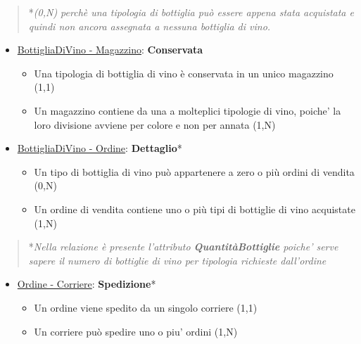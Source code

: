 \begin{verse}
	*\emph{(0,N) perchè una tipologia di bottiglia può essere appena stata acquistata e quindi non ancora assegnata a nessuna bottiglia di vino.}
\end{verse}

\begin{itemize}
	\item \underline{BottigliaDiVino - Magazzino}: \textbf{Conservata}
	
	\begin{itemize}
		\item Una tipologia di bottiglia di vino è conservata in un unico magazzino (1,1)
		\item Un magazzino contiene da una a molteplici tipologie di vino, poiche' la loro divisione avviene per colore e non per annata (1,N)
	\end{itemize}
	
\end{itemize}

\begin{itemize}
	\item \underline{BottigliaDiVino - Ordine}: \textbf{Dettaglio}*
	
	\begin{itemize}
		\item Un tipo di bottiglia di vino può appartenere a zero o più ordini di vendita (0,N)
		\item Un ordine di vendita contiene uno o più tipi di bottiglie di vino acquistate (1,N)
	\end{itemize}
	
\end{itemize}

\begin{verse}
	*\emph{Nella relazione è presente l'attributo \textbf{QuantitàBottiglie} poiche' serve sapere il numero di bottiglie di vino per tipologia richieste dall'ordine}
\end{verse}

\begin{itemize}
	\item \underline{Ordine - Corriere}: \textbf{Spedizione}*
	
	\begin{itemize}
		\item Un ordine viene spedito da un singolo corriere (1,1)
		\item Un corriere può spedire uno o piu' ordini (1,N)
	\end{itemize}
	
\end{itemize}

